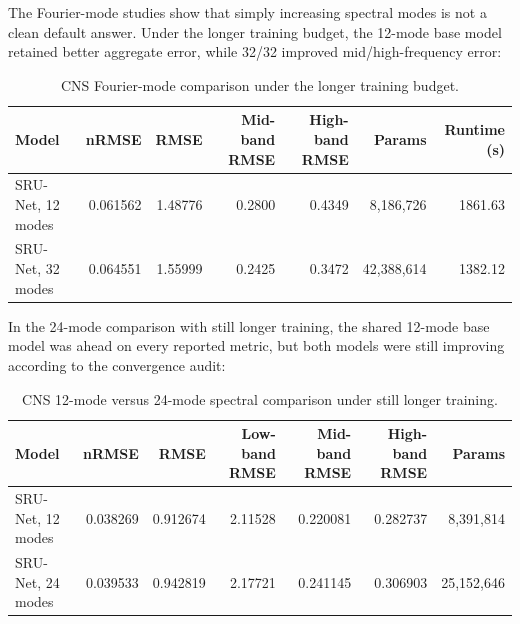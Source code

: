 \documentclass[11pt]{article}
\begin{document}
The Fourier-mode studies show that simply increasing spectral modes is not a
clean default answer. Under the longer training budget, the 12-mode base model
retained better aggregate error, while 32/32 improved mid/high-frequency error:

\begin{table}[h]
\centering
\caption{CNS Fourier-mode comparison under the longer training budget.}
\begin{tabular}{lrrrrrr}
\toprule
Model & nRMSE & RMSE & Mid-band RMSE & High-band RMSE & Params & Runtime (s) \\
\midrule
SRU-Net, 12 modes & 0.061562 & 1.48776 & 0.2800 & 0.4349 & 8,186,726 & 1861.63 \\
SRU-Net, 32 modes & 0.064551 & 1.55999 & 0.2425 & 0.3472 & 42,388,614 & 1382.12 \\
\bottomrule
\end{tabular}
\end{table}

In the 24-mode comparison with still longer training, the shared 12-mode base
model was ahead on every reported metric, but both models were still improving
according to the convergence audit:

\begin{table}[h]
\centering
\caption{CNS 12-mode versus 24-mode spectral comparison under still longer
training.}
\begin{tabular}{lrrrrrr}
\toprule
Model & nRMSE & RMSE & Low-band RMSE & Mid-band RMSE & High-band RMSE & Params \\
\midrule
SRU-Net, 12 modes & 0.038269 & 0.912674 & 2.11528 & 0.220081 & 0.282737 & 8,391,814 \\
SRU-Net, 24 modes & 0.039533 & 0.942819 & 2.17721 & 0.241145 & 0.306903 & 25,152,646 \\
\bottomrule
\end{tabular}
\end{table}
\end{document}
